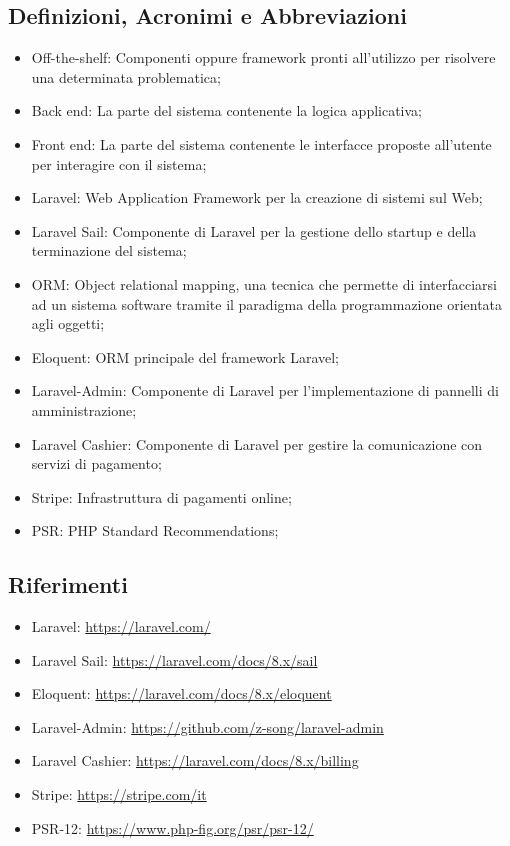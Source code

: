 \subsection{Definizioni, Acronimi e Abbreviazioni}
\begin{itemize}
	\item Off-the-shelf: Componenti oppure framework pronti all’utilizzo per risolvere una determinata problematica;
	\item Back end: La parte del sistema contenente la logica applicativa;
	\item Front end: La parte del sistema contenente le interfacce proposte all’utente per interagire con il sistema;
	\item Laravel: Web Application Framework per la creazione di sistemi sul Web;
	\item Laravel Sail: Componente di Laravel per la gestione dello startup e della terminazione del sistema;
	\item ORM: Object relational mapping, una tecnica che permette di interfacciarsi ad un sistema software tramite il paradigma della programmazione orientata agli oggetti;
	\item Eloquent: ORM principale del framework Laravel;
	\item Laravel-Admin: Componente di Laravel per l’implementazione di pannelli di amministrazione;
	\item Laravel Cashier: Componente di Laravel per gestire la comunicazione con servizi di pagamento;
	\item Stripe: Infrastruttura di pagamenti online;
	\item PSR: PHP Standard Recommendations;
\end{itemize}

\subsection{Riferimenti}
\begin{itemize}
	\item Laravel: \url{https://laravel.com/}
	\item Laravel Sail: \url{https://laravel.com/docs/8.x/sail}
	\item Eloquent: \url{https://laravel.com/docs/8.x/eloquent}
	\item Laravel-Admin: \url{https://github.com/z-song/laravel-admin}
	\item Laravel Cashier: \url{https://laravel.com/docs/8.x/billing}
	\item Stripe: \url{https://stripe.com/it}
	\item PSR-12: \url{https://www.php-fig.org/psr/psr-12/}
\end{itemize}